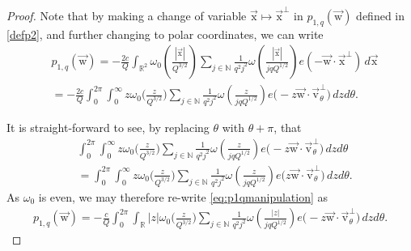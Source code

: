 \documentclass[letterpaper,11pt]{amsart}
\numberwithin{equation}{section}
\theoremstyle{definition}
\numberwithin{equation}{section}
\newcommand{\NN}{\mathbb{N}}
\newcommand{\ux}{{\vec{\mathrm{x}}}}
\newcommand{\uw}{{\vec{\mathrm{w}}}}
\newcommand{\uv}{{\vec{\mathrm{v}}}}
\newcommand{\R}{\mathbb{R}}
\begin{document}
\begin{proof}
	Note that by making a change of variable $\ux \mapsto \ux^\perp$ in $p_{1, q}(\uw)$ defined in \eqref{defp2}, and further changing to polar coordinates, we can write
    \begin{equation}
    \begin{split}
    &p_{1,q}(\uw)
			=
			-\frac{2c}{Q}
			\int_{\R^2} 
			\omega_0\left(\frac{|\ux|}{Q^{3/2}}\right)
			\sum_{j\in\NN}
			\frac{1}{q^2j^2}
			\omega
			\left(\frac{|\ux|}{jqQ^{1/2}}
			\right)
			e(-\uw\cdot \ux^\perp)
			\,d\ux\\
            &=-\frac{2c}{Q}\int_{0}^{2\pi}\int_{0}^\infty z\omega_0\Big(\frac{z}{Q^{3/2}}\Big) \sum_{j\in\NN}
			\frac{1}{q^2j^2}
			\omega
			\left(\frac{z}{jqQ^{1/2}}
			\right)
			e\Big(-z\uw\cdot \uv_{\theta}^\perp\Big)
			\,dz d\theta.\label{eq:p1qmanipulation}
            \end{split}
            \end{equation}

It is straight-forward to see, by replacing $\theta$ with $\theta+\pi$, that
\begin{align*}
    &\int_{0}^{2\pi}\int_{0}^\infty z\omega_0\Big(\frac{z}{Q^{3/2}}\Big) \sum_{j\in\NN}
			\frac{1}{q^2j^2}
			\omega
			\left(\frac{z}{jqQ^{1/2}}
			\right)
			e\Big(-z\uw\cdot \uv_{\theta}^\perp\Big)
			\,dz d\theta\\&=\int_{0}^{2\pi}\int_{0}^\infty z\omega_0\Big(\frac{z}{Q^{3/2}}\Big) \sum_{j\in\NN}
			\frac{1}{q^2j^2}
			\omega
			\left(\frac{z}{jqQ^{1/2}}
			\right)
			e\Big(z\uw\cdot \uv_{\theta}^\perp\Big)
			\,dz d\theta.
\end{align*}
As $\omega_0$ is even, we may therefore re-write \eqref{eq:p1qmanipulation} as
\begin{align*}p_{1,q}(\uw)
			=-\frac{c}{Q}\int_{0}^{2\pi}\int_{\mathbb R} |z|\omega_0\Big(\frac{z}{Q^{3/2}}\Big) \sum_{j\in\NN}
			\frac{1}{q^2j^2}
			\omega
			\left(\frac{|z|}{jqQ^{1/2}}
			\right)
			e\big(-z\uw\cdot \uv_{\theta}^\perp\big)
			\,dz d\theta.
            \end{align*}


\end{proof}
\end{document}
